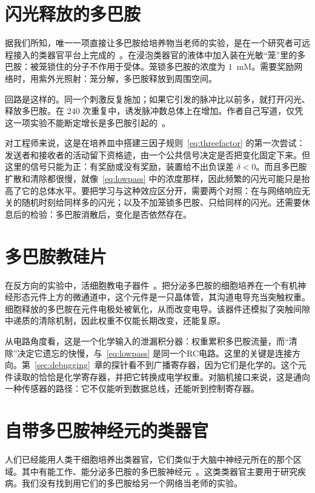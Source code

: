 \section{闪光释放的多巴胺}
\label{sec:dishdopamine}

据我们所知，唯一一项直接让多巴胺给培养物当老师的实验，是在一个研究者可远程接入的类器官平台上完成的~\cite{Jordan2024}。在浸泡类器官的液体中加入装在光敏“笼”里的多巴胺：被笼锁住的分子不作用于受体。笼锁多巴胺的浓度为 $1$~mM。需要奖励网络时，用紫外光照射：笼分解，多巴胺释放到周围空间。

回路是这样的。同一个刺激反复施加；如果它引发的脉冲比以前多，就打开闪光、释放多巴胺。在 $240$ 次重复中，诱发脉冲数总体上在增加。作者自己写道，仅凭这一项实验不能断定增长是多巴胺引起的~\cite{Jordan2024}。

对工程师来说，这是在培养皿中搭建三因子规则~\eqref{eq:threefactor} 的第一次尝试：发送者和接收者的活动留下资格迹，由一个公共信号决定是否把变化固定下来。但这里的信号只能为正：有奖励或没有奖励，装置给不出负误差 $\delta<0$。而且多巴胺扩散和清除都很慢，就像~\eqref{eq:lowpass} 中的浓度那样，因此频繁的闪光可能只是抬高了它的总体水平。要把学习与这种效应区分开，需要两个对照：在与网络响应无关的随机时刻给同样多的闪光；以及不加笼锁多巴胺、只给同样的闪光。还需要休息后的检验：多巴胺消散后，变化是否依然存在。

\section{多巴胺教硅片}
\label{sec:biohybrid}

在反方向的实验中，活细胞教电子器件~\cite{Keene2020}。把分泌多巴胺的细胞培养在一个有机神经形态元件上方的微通道中，这个元件是一只晶体管，其沟道电导充当突触权重。细胞释放的多巴胺在元件电极处被氧化，从而改变电导。该器件还模拟了突触间隙中递质的清除机制，因此权重不仅能长期改变，还能复原。

从电路角度看，这是一个化学输入的泄漏积分器：权重累积多巴胺流量，而“清除”决定它遗忘的快慢，与~\eqref{eq:lowpass} 是同一个RC电路。这里的关键是连接方向。第~\ref{sec:debugging}~章的探针看不到广播寄存器，因为它们是化学的。这个元件读取的恰恰是化学寄存器，并把它转换成电学权重。对脑机接口来说，这是通向一种传感器的路径：它不仅能听到数据总线，还能听到控制寄存器。

\section{自带多巴胺神经元的类器官}
\label{sec:midbrainorg}

人们已经能用人类干细胞培养出类器官，它们类似于大脑中神经元所在的那个区域。其中有能工作、能分泌多巴胺的多巴胺神经元~\cite{Jo2016}。这类类器官主要用于研究疾病。我们没有找到用它们的多巴胺给另一个网络当老师的实验。


